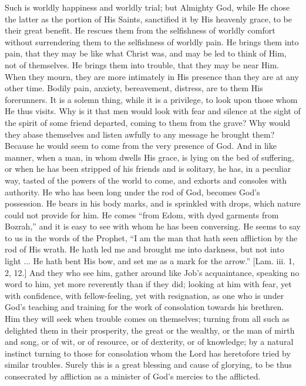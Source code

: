 Such is worldly happiness and worldly trial; but Almighty God,
while He chose the latter as the portion of His Saints, sanctified it
by His heavenly grace, to be their great benefit. He rescues them from
the selfishness of worldly comfort without surrendering them to the
selfishness of worldly pain. He brings them into pain, that they may
be like what Christ was, and may be led to think of Him, not of
themselves. He brings them into trouble, that they may be near Him.
When they mourn, they are more intimately in His presence than they
are at any other time. Bodily pain, anxiety, bereavement, distress,
are to them His forerunners. It is a solemn thing, while it is a
privilege, to look upon those whom He thus visits. Why is it that men
would look with fear and silence at the sight of the spirit of some
friend departed, coming to them from the grave? Why would they abase
themselves and listen awfully to any message he brought them? Because
he would seem to come from the very presence of God. And in like
manner, when a man, in whom dwells His grace, is lying on the bed of
suffering, or when he has been stripped of his friends and is
solitary, he has, in a peculiar way, tasted of the powers of the world
to come, and exhorts and consoles with authority. He who has been long
under the rod of God, becomes God's possession. He bears in his body
marks, and is sprinkled with drops, which nature could not provide for
him. He comes ``from Edom, with dyed garments from Bozrah,''
and it is easy to see with whom he has been conversing. He seems to
say to us in the words of the Prophet, ``I am the man that hath
seen affliction by the rod of His wrath. He hath led me and brought me
into darkness, but not into light ... He hath bent His bow, and set me
as a mark for the arrow.'' [Lam. iii. 1, 2, 12.] And they who see
him, gather around like Job's acquaintance, speaking no word to him,
yet more reverently than if they did; looking at him with fear, yet
with confidence, with fellow-feeling, yet with resignation, as one who
is under God's teaching and training for the work of consolation
towards his brethren. Him they will seek when trouble comes on
themselves; turning from all such as delighted them in their
prosperity, the great or the wealthy, or the man of mirth and song, or
of wit, or of resource, or of dexterity, or of knowledge; by a natural
instinct turning to those for consolation whom the Lord has heretofore
tried by similar troubles. Surely this is a great blessing and cause
of glorying, to be thus consecrated by affliction as a minister of
God's mercies to the afflicted.

